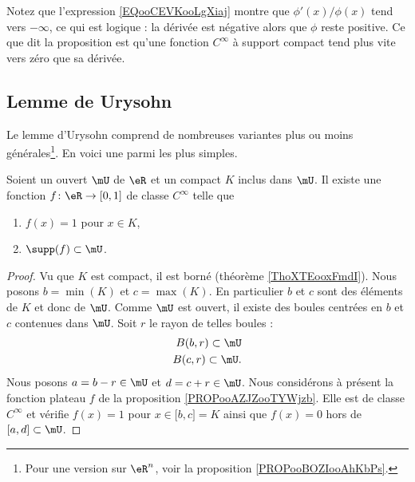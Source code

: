 Notez que l'expression \ref{EQooCEVKooLgXiaj} montre que \( \phi'(x)/\phi(x)\) tend vers \( -\infty\), ce qui est logique : la dérivée est négative alors que \( \phi\) reste positive. Ce que dit la proposition est qu'une fonction \(  C^{\infty}\) à support compact tend plus vite vers zéro que sa dérivée.

\subsection{Lemme de Urysohn}

Le lemme d'Urysohn comprend de nombreuses variantes plus ou moins générales\footnote{Pour une version sur \( \eR^n\), voir la proposition \ref{PROPooBOZIooAhKbPs}.}. En voici une parmi les plus simples.
\begin{lemma}      \label{LEMooECTNooKagaRU}
	Soient un ouvert \( \mU\) de \( \eR\) et un compact \( K\) inclus dans \( \mU\). Il existe une fonction \( f\colon \eR\to \mathopen[ 0 , 1 \mathclose]\) de classe  \(  C^{\infty}\) telle que
	\begin{enumerate}
		\item
		      \( f(x)=1\) pour \( x\in K\),
		\item
		      \( \supp(f)\subset \mU\).
	\end{enumerate}
\end{lemma}

\begin{proof}
	Vu que \( K\) est compact, il est borné (théorème \ref{ThoXTEooxFmdI}). Nous posons \( b=\min(K)\) et \( c=\max(K)\). En particulier \( b\) et \( c\) sont des éléments de \( K\) et donc de \( \mU\). Comme \( \mU\) est ouvert, il existe des boules centrées en \( b\) et \( c\) contenues dans \( \mU\). Soit \( r\) le rayon de telles boules :
	\begin{subequations}
		\begin{align}
			B(b,r)\subset \mU \\
			B(c,r)\subset \mU.
		\end{align}
	\end{subequations}
	Nous posons \( a=b-r\in \mU\) et \( d=c+r\in \mU\). Nous considérons à présent la fonction plateau \( f\) de la proposition \ref{PROPooAZJZooTYWjzb}. Elle est de classe \(  C^{\infty}\) et vérifie \( f(x)=1\) pour \( x\in \mathopen[ b , c \mathclose]=K\) ainsi que \( f(x)=0\) hors de \( \mathopen[ a , d \mathclose]\subset \mU\).
\end{proof}

